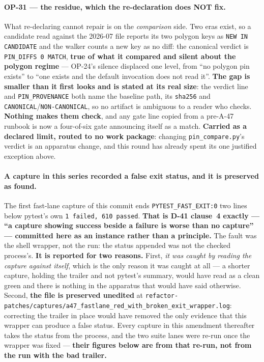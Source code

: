 \documentclass[
  10pt,
]{article}
\begin{document}
\paragraph{OP-31 --- the residue, which the re-declaration does NOT fix.}
What re-declaring cannot repair is on the \emph{comparison} side. Two eras exist, so a candidate read against the 2026-07 file reports its two polygon keys as \texttt{NEW IN CANDIDATE} and the walker counts a new key as no diff: the canonical verdict is \texttt{PIN\_DIFFS 0 MATCH}, \textbf{true of what it compared and silent about the polygon regime} --- OP-24's silence displaced one level, from ``no polygon pin exists'' to ``one exists and the default invocation does not read it''. \textbf{The gap is smaller than it first looks and is stated at its real size}: the verdict line and \texttt{PIN\_PROVENANCE} both name the baseline path, its \texttt{sha256} and \texttt{CANONICAL}/\texttt{NON-CANONICAL}, so no artifact is ambiguous to a reader who checks. \textbf{Nothing makes them check}, and any gate line copied from a pre-A-47 runbook is now a four-of-six gate announcing itself as a match. \textbf{Carried as a declared limit, routed to no work package}: changing \texttt{pin\_compare.py}'s verdict is an apparatus change, and this round has already spent its one justified exception above.

\paragraph{A capture in this series recorded a false exit status, and it is preserved as found.}
The first fast-lane capture of this commit ends \texttt{PYTEST\_FAST\_EXIT:0} two lines below pytest's own \texttt{1 failed, 610 passed}. \textbf{That is D-41 clause~4 exactly --- ``a capture showing success beside a failure is worse than no capture'' --- committed here as an instance rather than a principle.} The fault was the shell wrapper, not the run: the status appended was not the checked process's. \textbf{It is reported for two reasons.} First, \emph{it was caught by reading the capture against itself}, which is the only reason it was caught at all --- a shorter capture, holding the trailer and not pytest's summary, would have read as a clean green and there is nothing in the apparatus that would have said otherwise. Second, \textbf{the file is preserved unedited} at \texttt{refactor-patches/\allowbreak{}captures/\allowbreak{}a47\_fastlane\_red\_with\_broken\_exit\_wrapper.log}: correcting the trailer in place would have removed the only evidence that this wrapper can produce a false status. Every capture in this amendment thereafter takes the status from the process, and the two suite lanes were re-run once the wrapper was fixed --- \textbf{their figures below are from that re-run, not from the run with the bad trailer.}
\end{document}
